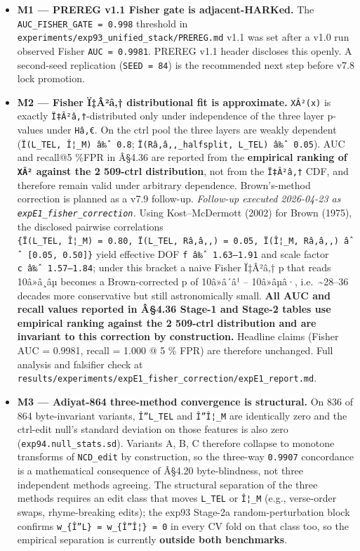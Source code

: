 \documentclass[
]{article}
\providecommand{\tightlist}{%
  \setlength{\itemsep}{0pt}\setlength{\parskip}{0pt}}
\begin{document}
\begin{itemize}
\tightlist
\item
  \textbf{M1 --- PREREG v1.1 Fisher gate is adjacent-HARKed.} The
  \texttt{AUC\_FISHER\_GATE\ =\ 0.998} threshold in
  \texttt{experiments/exp93\_unified\_stack/PREREG.md} v1.1 was set
  after a v1.0 run observed Fisher \texttt{AUC\ =\ 0.9981}. PREREG v1.1
  header discloses this openly. A second-seed replication
  (\texttt{SEED\ =\ 84}) is the recommended next step before v7.8 lock
  promotion.
\item
  \textbf{M2 --- Fisher Ï‡Â²â‚† distributional fit is approximate.}
  \texttt{XÂ²(x)} is exactly \texttt{Ï‡Â²â‚†}-distributed only under
  independence of the three layer p-values under \texttt{Hâ‚€}. On the
  ctrl pool the three layers are weakly dependent
  (\texttt{Ï(L\_TEL,\ Î¦\_M)\ â‰ˆ\ 0.8};
  \texttt{Ï(Râ‚â‚‚\_halfsplit,\ L\_TEL)\ â‰ˆ\ 0.05}). AUC and recall@5
  \%FPR in Â§4.36 are reported from the \textbf{empirical ranking of
  \texttt{XÂ²} against the 2 509-ctrl distribution}, not from the
  \texttt{Ï‡Â²â‚†} CDF, and therefore remain valid under arbitrary
  dependence. Brown's-method correction is planned as a v7.9 follow-up.
  \emph{Follow-up executed 2026-04-23 as
  \texttt{expE1\_fisher\_correction}.} Using Kost--McDermott (2002) for
  Brown (1975), the disclosed pairwise correlations
  \texttt{\{Ï(L\_TEL,\ Î¦\_M)\ =\ 0.80,\ Ï(L\_TEL,\ Râ‚â‚‚)\ =\ 0.05,\ Ï(Î¦\_M,\ Râ‚â‚‚)\ âˆˆ\ {[}0.05,\ 0.50{]}\}}
  yield effective DOF \texttt{f\ â‰ˆ\ 1.63–1.91} and scale factor
  \texttt{c\ â‰ˆ\ 1.57–1.84}; under this bracket a naive Fisher Ï‡Â²â‚†
  p that reads 10â»â¸âµ becomes a Brown-corrected p of 10â»â´â¹ --
  10â»âµâ·, i.e.~\textasciitilde28--36 decades more conservative but
  still astronomically small. \textbf{All AUC and recall values reported
  in Â§4.36 Stage-1 and Stage-2 tables use empirical ranking against the
  2 509-ctrl distribution and are invariant to this correction by
  construction.} Headline claims (Fisher AUC = 0.9981, recall = 1.000 @
  5 \% FPR) are therefore unchanged. Full analysis and falsifier check
  at
  \texttt{results/experiments/expE1\_fisher\_correction/expE1\_report.md}.
\item
  \textbf{M3 --- Adiyat-864 three-method convergence is structural.} On
  836 of 864 byte-invariant variants,
  \texttt{\textbar{}Î”L\_TEL\textbar{}} and
  \texttt{\textbar{}Î”Î¦\_M\textbar{}} are identically zero and the
  ctrl-edit null's standard deviation on those features is also zero
  (\texttt{exp94.null\_stats.sd}). Variants A, B, C therefore collapse
  to monotone transforms of \texttt{NCD\_edit} by construction, so the
  three-way \texttt{0.9907} concordance is a mathematical consequence of
  Â§4.20 byte-blindness, not three independent methods agreeing. The
  structural separation of the three methods requires an edit class that
  moves \texttt{L\_TEL} or \texttt{Î¦\_M} (e.g., verse-order swaps,
  rhyme-breaking edits); the exp93 Stage-2a random-perturbation block
  confirms
  \texttt{w\_\{\textbar{}Î”L\textbar{}\}\ =\ w\_\{\textbar{}Î”Î¦\textbar{}\}\ =\ 0}
  in every CV fold on that class too, so the empirical separation is
  currently \textbf{outside both benchmarks}.
\end{itemize}
\end{document}
